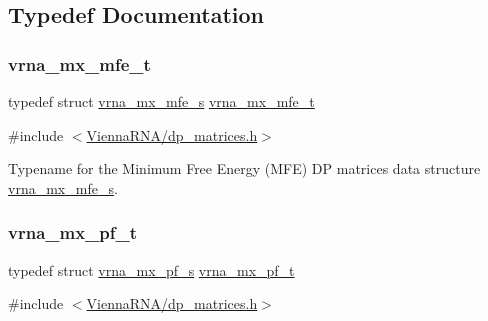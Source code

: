 \subsection{Typedef Documentation}
\mbox{\label{group__dp__matrices_gae5aef35d016475e758f619b7bcb534f9}} 
\subsubsection{\texorpdfstring{vrna\+\_\+mx\+\_\+mfe\+\_\+t}{vrna\_mx\_mfe\_t}}
{\footnotesize\ttfamily typedef struct \mbox{\hyperlink{group__dp__matrices_structvrna__mx__mfe__s}{vrna\+\_\+mx\+\_\+mfe\+\_\+s}} \mbox{\hyperlink{group__dp__matrices_gae5aef35d016475e758f619b7bcb534f9}{vrna\+\_\+mx\+\_\+mfe\+\_\+t}}}



{\ttfamily \#include $<$\mbox{\hyperlink{dp__matrices_8h}{Vienna\+R\+N\+A/dp\+\_\+matrices.\+h}}$>$}



Typename for the Minimum Free Energy (M\+FE) DP matrices data structure \mbox{\hyperlink{group__dp__matrices_structvrna__mx__mfe__s}{vrna\+\_\+mx\+\_\+mfe\+\_\+s}}. 

\mbox{\label{group__dp__matrices_ga68729ab3fed26bdd1806fa814f172fc1}} 
\subsubsection{\texorpdfstring{vrna\+\_\+mx\+\_\+pf\+\_\+t}{vrna\_mx\_pf\_t}}
{\footnotesize\ttfamily typedef struct \mbox{\hyperlink{group__dp__matrices_structvrna__mx__pf__s}{vrna\+\_\+mx\+\_\+pf\+\_\+s}} \mbox{\hyperlink{group__dp__matrices_ga68729ab3fed26bdd1806fa814f172fc1}{vrna\+\_\+mx\+\_\+pf\+\_\+t}}}



{\ttfamily \#include $<$\mbox{\hyperlink{dp__matrices_8h}{Vienna\+R\+N\+A/dp\+\_\+matrices.\+h}}$>$}




